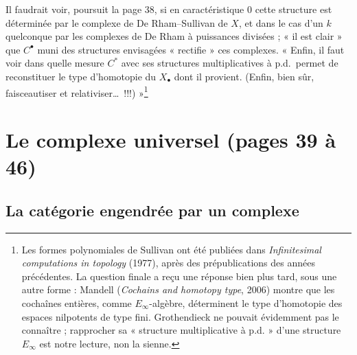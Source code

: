 \documentclass[11pt,a4paper]{article}
\begin{document}
Il faudrait voir, poursuit la page 38, si en caractéristique $0$ cette
structure est déterminée par le complexe de De Rham–Sullivan de $X$, et dans
le cas d'un $k$ quelconque par les complexes de De Rham à puissances
divisées ; « il est clair » que $C^{\bullet}$ muni des structures envisagées
« rectifie » ces complexes. « Enfin, il faut voir dans quelle mesure
$C^{*}$ avec ses structures multiplicatives à p.d.\ permet de reconstituer le
type d'homotopie du $X_{\bullet}$ dont il provient. (Enfin, bien sûr,
faisceautiser et relativiser\ldots\ !!!) »\footnote{Les formes polynomiales
de Sullivan ont été publiées dans \emph{Infinitesimal computations in
topology} (1977), après des prépublications des années précédentes. La
question finale a reçu une réponse bien plus tard, sous une autre forme :
Mandell (\emph{Cochains and homotopy type}, 2006) montre que les cochaînes
entières, comme $E_{\infty}$-algèbre, déterminent le type d'homotopie des
espaces nilpotents de type fini. Grothendieck ne pouvait évidemment pas le
connaître ; rapprocher sa « structure multiplicative à p.d. » d'une
structure $E_{\infty}$ est notre lecture, non la sienne.}

\section*{Le complexe universel (pages 39 à 46)}

\subsection*{La catégorie engendrée par un complexe}
\end{document}
